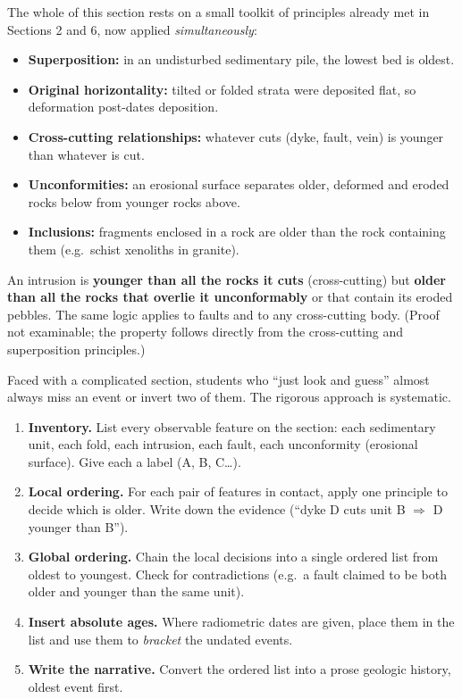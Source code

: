 \documentclass[11pt]{article}
\newcounter{popsec}
\newcounter{popsub}
\newcommand{\courssub}[1]{%
  \stepcounter{popsub}%
  \par\vspace{9pt}\noindent{\popxbold\fontsize{11.5}{13}\selectfont\color{popink}{\color{poporange}\thepopsec.\thepopsub}\hspace{6pt}#1}\par\nopagebreak\vspace{4pt}
}
\begin{document}
The whole of this section rests on a small toolkit of principles already met in Sections 2 and 6, now applied \emph{simultaneously}:

\begin{itemize}
\item \textbf{Superposition:} in an undisturbed sedimentary pile, the lowest bed is oldest.
\item \textbf{Original horizontality:} tilted or folded strata were deposited flat, so deformation post-dates deposition.
\item \textbf{Cross-cutting relationships:} whatever cuts (dyke, fault, vein) is younger than whatever is cut.
\item \textbf{Unconformities:} an erosional surface separates older, deformed and eroded rocks below from younger rocks above.
\item \textbf{Inclusions:} fragments enclosed in a rock are older than the rock containing them (e.g.\ schist xenoliths in granite).
\end{itemize}

\begin{propriete}
An intrusion is \textbf{younger than all the rocks it cuts} (cross-cutting) but \textbf{older than all the rocks that overlie it unconformably} or that contain its eroded pebbles. The same logic applies to faults and to any cross-cutting body. (Proof not examinable; the property follows directly from the cross-cutting and superposition principles.)
\end{propriete}

\courssub{The Event List technique}

Faced with a complicated section, students who ``just look and guess'' almost always miss an event or invert two of them. The rigorous approach is systematic.

\begin{methode}
\begin{enumerate}
\item \textbf{Inventory.} List every observable feature on the section: each sedimentary unit, each fold, each intrusion, each fault, each unconformity (erosional surface). Give each a label (A, B, C\ldots).
\item \textbf{Local ordering.} For each pair of features in contact, apply one principle to decide which is older. Write down the evidence (``dyke D cuts unit B $\Rightarrow$ D younger than B'').
\item \textbf{Global ordering.} Chain the local decisions into a single ordered list from oldest to youngest. Check for contradictions (e.g.\ a fault claimed to be both older and younger than the same unit).
\item \textbf{Insert absolute ages.} Where radiometric dates are given, place them in the list and use them to \emph{bracket} the undated events.
\item \textbf{Write the narrative.} Convert the ordered list into a prose geologic history, oldest event first.
\end{enumerate}
\end{methode}
\end{document}
